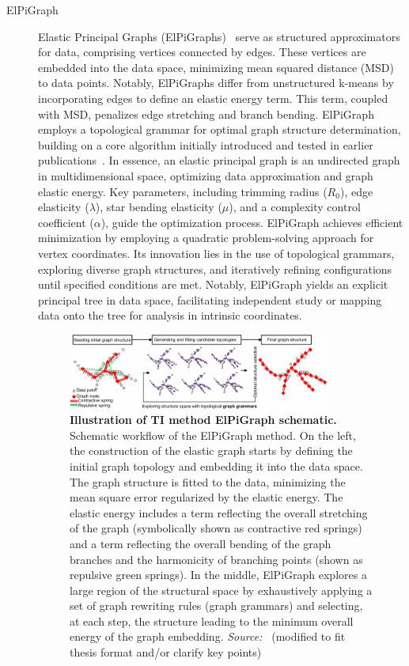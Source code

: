 \begin{description}
  \item[ElPiGraph]
  Elastic Principal Graphs (ElPiGraphs)~\citep{albergante2020ElPiGraph} serve as structured approximators for data, comprising vertices connected by edges. These vertices are embedded into the data space, minimizing mean squared distance (MSD) to data points. Notably, ElPiGraphs differ from unstructured k-means by incorporating edges to define an elastic energy term. This term, coupled with MSD, penalizes edge stretching and branch bending. ElPiGraph employs a topological grammar for optimal graph structure determination, building on a core algorithm initially introduced and tested in earlier publications~\citep{gorban2007topological}. In essence, an elastic principal graph is an undirected graph in multidimensional space, optimizing data approximation and graph elastic energy. Key parameters, including trimming radius ($R_0$), edge elasticity ($\lambda$), star bending elasticity ($\mu$), and a complexity control coefficient ($\alpha$), guide the optimization process. ElPiGraph achieves efficient minimization by employing a quadratic problem-solving approach for vertex coordinates. Its innovation lies in the use of topological grammars, exploring diverse graph structures, and iteratively refining configurations until specified conditions are met. Notably, ElPiGraph yields an explicit principal tree in data space, facilitating independent study or mapping data onto the tree for analysis in intrinsic coordinates.

   \begin{figure}[ht!]
  	\centering
  	\includegraphics[width=0.85\textwidth]{TI_Alg_ElPiGraph/fig}
  	\vspace{0.1cm}
  	\caption[Illustration of TI method ElPiGraph schematic.]{\textbf{Illustration of TI method ElPiGraph schematic.} Schematic workflow of the ElPiGraph method. On the left, the construction of the elastic graph starts by defining the initial graph topology and embedding it into the data space. The graph structure is fitted to the data, minimizing the mean square error regularized by the elastic energy. The elastic energy includes a term reflecting the overall stretching of the graph (symbolically shown as contractive red springs) and a term reflecting the overall bending of the graph branches and the harmonicity of branching points (shown as repulsive green springs). In the middle, ElPiGraph explores a large region of the structural space by exhaustively applying a set of graph rewriting rules (graph grammars) and selecting, at each step, the structure leading to the minimum overall energy of the graph embedding. \emph{Source:~\cite{cao2019monocle3}} (modified to fit thesis format and/or clarify key points)
  	}
  	\label{fig:TI_Alg_ElPiGraph}
  \end{figure}


\end{description}
